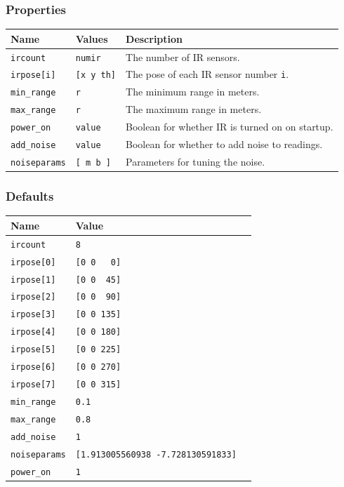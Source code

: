 \documentclass[11pt,twoside]{report}
\begin{document}
\subsubsection*{Properties}
\begin{tabularx}{\columnwidth}{llX}
\hline
Name & Values & Description \\
\hline
\verb'ircount' & \verb'numir' & The number of IR sensors.\\
\verb'irpose[i]' & \verb'[x y th]' & The pose of each IR sensor number {\tt i}.\\
\verb'min_range' & \verb'r' & The minimum range in meters. \\
\verb'max_range' & \verb'r' & The maximum range in meters. \\
\verb'power_on' & \verb'value' & Boolean for whether IR is turned on on startup.\\
\verb'add_noise' & \verb'value' & Boolean for whether to add noise to readings. \\
\verb'noiseparams' & \verb'[ m b ]' & Parameters for tuning the noise. \\
\hline
\end{tabularx}

\subsubsection*{Defaults}
\begin{tabularx}{\columnwidth}{llX}
\hline
Name & Value\\
\hline
\verb'ircount' & \verb'8'\\
\verb'irpose[0]' & \verb'[0 0   0]'\\
\verb'irpose[1]' & \verb'[0 0  45]'\\
\verb'irpose[2]' & \verb'[0 0  90]'\\
\verb'irpose[3]' & \verb'[0 0 135]'\\
\verb'irpose[4]' & \verb'[0 0 180]'\\
\verb'irpose[5]' & \verb'[0 0 225]'\\
\verb'irpose[6]' & \verb'[0 0 270]'\\
\verb'irpose[7]' & \verb'[0 0 315]'\\
\verb'min_range' & \verb'0.1'\\
\verb'max_range' & \verb'0.8'\\
\verb'add_noise' & \verb'1'\\
\verb'noiseparams' & \verb'[1.913005560938 -7.728130591833]'\\
\verb'power_on' & \verb'1'\\
\hline
\end{tabularx}
\end{document}
